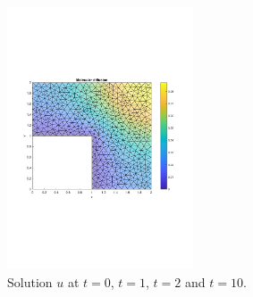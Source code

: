 \documentclass[11pt, a4paper]{article}
\begin{document}
\begin{figure}
  \includegraphics[width=0.49\textwidth]{assets/sol_t10_0090.pdf}
  \caption{Solution $u$ at $t=0$, $t=1$, $t=2$ and $t=10$.}\label{fig:sol90}
\end{figure}
\end{document}

